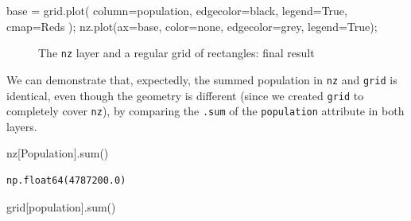 \documentclass[
  letterpaper,
]{krantz}
\newenvironment{Shaded}{\begin{snugshade}}{\end{snugshade}}
\newcommand{\BuiltInTok}[1]{\textcolor[rgb]{0.00,0.23,0.31}{#1}}
\newcommand{\NormalTok}[1]{\textcolor[rgb]{0.00,0.23,0.31}{#1}}
\newcommand{\OperatorTok}[1]{\textcolor[rgb]{0.37,0.37,0.37}{#1}}
\newcommand{\StringTok}[1]{\textcolor[rgb]{0.13,0.47,0.30}{#1}}
\newcommand{\VariableTok}[1]{\textcolor[rgb]{0.07,0.07,0.07}{#1}}
\begin{document}
\begin{Shaded}
\begin{Highlighting}[]
\NormalTok{base }\OperatorTok{=}\NormalTok{ grid.plot(}
\NormalTok{    column}\OperatorTok{=}\StringTok{\textquotesingle{}population\textquotesingle{}}\NormalTok{, }
\NormalTok{    edgecolor}\OperatorTok{=}\StringTok{\textquotesingle{}black\textquotesingle{}}\NormalTok{,}
\NormalTok{    legend}\OperatorTok{=}\VariableTok{True}\NormalTok{, }
\NormalTok{    cmap}\OperatorTok{=}\StringTok{\textquotesingle{}Reds\textquotesingle{}}
\NormalTok{)}\OperatorTok{;}
\NormalTok{nz.plot(ax}\OperatorTok{=}\NormalTok{base, color}\OperatorTok{=}\StringTok{\textquotesingle{}none\textquotesingle{}}\NormalTok{, edgecolor}\OperatorTok{=}\StringTok{\textquotesingle{}grey\textquotesingle{}}\NormalTok{, legend}\OperatorTok{=}\VariableTok{True}\NormalTok{)}\OperatorTok{;}
\end{Highlighting}
\end{Shaded}

\begin{figure}[H]


\caption{\label{fig-nz-and-grid3}The \texttt{nz} layer and a regular
grid of rectangles: final result}

\end{figure}%

We can demonstrate that, expectedly, the summed population in
\texttt{nz} and \texttt{grid} is identical, even though the geometry is
different (since we created \texttt{grid} to completely cover
\texttt{nz}), by comparing the \texttt{.sum} of the \texttt{population}
attribute in both layers.

\begin{Shaded}
\begin{Highlighting}[]
\NormalTok{nz[}\StringTok{\textquotesingle{}Population\textquotesingle{}}\NormalTok{].}\BuiltInTok{sum}\NormalTok{()}
\end{Highlighting}
\end{Shaded}

\begin{verbatim}
np.float64(4787200.0)
\end{verbatim}

\begin{Shaded}
\begin{Highlighting}[]
\NormalTok{grid[}\StringTok{\textquotesingle{}population\textquotesingle{}}\NormalTok{].}\BuiltInTok{sum}\NormalTok{()}
\end{Highlighting}
\end{Shaded}
\end{document}
